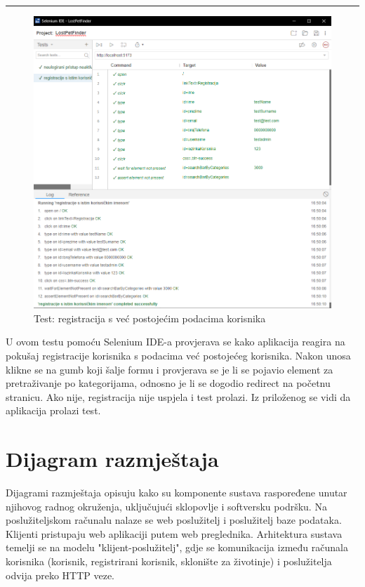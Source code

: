 \par\noindent\rule{\textwidth}{0.5pt}

\begin{figure}[!htb]
	\centering
	\includegraphics[width=\textwidth]{slike/selenium_test_2.png}
	\caption{Test: registracija s već postojećim podacima korisnika}
\end{figure}

U ovom testu pomoću Selenium IDE-a provjerava se kako aplikacija reagira na pokušaj registracije korisnika s podacima već postojećeg korisnika. Nakon unosa klikne se na gumb koji šalje formu i provjerava se je li se pojavio element za pretraživanje po kategorijama, odnosno je li se dogodio redirect na početnu stranicu. Ako nije, registracija nije uspjela i test prolazi. Iz priloženog se vidi da aplikacija prolazi test.

\eject


\section{Dijagram razmještaja}

\noindent Dijagrami razmještaja opisuju kako su komponente sustava raspoređene unutar njihovog radnog okruženja, uključujući sklopovlje i softversku podršku. Na poslužiteljskom računalu nalaze se web poslužitelj i poslužitelj baze podataka. Klijenti pristupaju web aplikaciji putem web preglednika. Arhitektura sustava temelji se na modelu "klijent-poslužitelj", gdje se komunikacija između računala korisnika (korisnik, registrirani korisnik, sklonište za životinje) i poslužitelja odvija preko HTTP veze.

